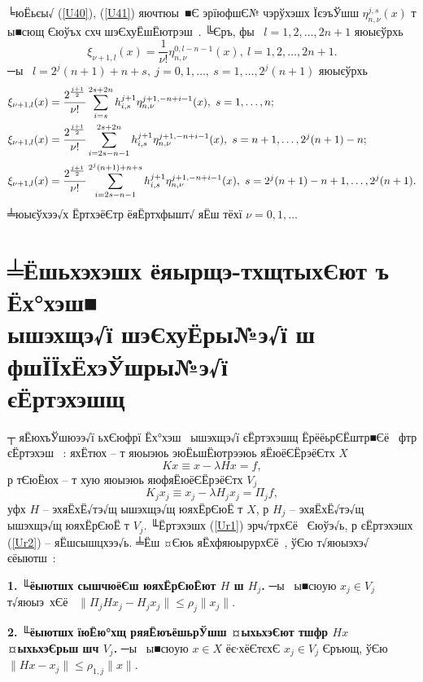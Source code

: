 \documentclass[12pt, a4paper, oneside]{article}
\begin{document}
\par
╘юЁьєы√ (\ref{U40}), (\ref{U41}) яючтюы ■Є эрїюфшЄ№ чэрўхэшх ЇєэъЎшш $\eta_{n,\nu}^{j,s}(x)$ т ы■сющ Єюўъх схч шэЄхуЁшЁютрэш . ╚Єръ, фы  $l=1,2,\dots, 2n+1$ яюыєўрхь
\[
{\xi}_{\nu+1,l}(x)=\frac{1}{\nu !} \eta_{n,\nu}^{0,l-n-1}(x),~l=1,2,\dots, 2n+1.
\]
─ы  $l=2^j(n+1)+n+s,~j=0,1,\dots,~s=1,\dots,2^{j}(n+1)$ яюыєўрхь
\begin{align}
&{\xi}_{\nu+1,l}(x)=\frac{2^{\frac{j+1}{2}}}{\nu !}\sum\limits_{i=s}^{2s+2n}h_{i,s}^{j+1}\eta_{n,\nu}^{j+1,-n+i-1}(x),~s=1,\dots,n; \notag\\
&{\xi}_{\nu+1,l}(x)=\frac{2^{\frac{j+1}{2}}}{\nu !}\sum\limits_{i=2s-n-1}^{2s+2n}h_{i,s}^{j+1}\eta_{n,\nu}^{j+1,-n+i-1}(x),~s=n+1,\dots,2^{j}(n+1)-n;\notag\\
&{\xi}_{\nu+1,l}(x)=\frac{2^{\frac{j+1}{2}}}{\nu !}\sum\limits_{i=2s-n-1}^{2^{j}(n+1)+n+s}h_{i,s}^{j+1}\eta_{n,\nu}^{j+1,-n+i-1}(x),~s=2^{j}(n+1)-n+1,\dots,2^{j}(n+1).\notag
\end{align}
╧юыєўхээ√х ЁртхэёЄтр ёяЁртхфышт√ яЁш тёхї $\nu = 0,1,\dots$
\section{╧Ёшьхэхэшх ёяырщэ-тхщтыхЄют ъ Ёх°хэш■\\ ышэхщэ√ї шэЄхуЁры№э√ї ш фшЇЇхЁхэЎшры№э√ї\\ єЁртэхэшщ}
┬ яЁюхъЎшюээ√ї ьхЄюфрї Ёх°хэш  ышэхщэ√ї єЁртэхэшщ ЁрёёьрЄЁштр■Єё  фтр єЁртэхэш   \cite{Akilov}: яхЁтюх -- т яюыэюь эюЁьшЁютрээюь яЁюёЄЁрэёЄтх $X$
\begin{equation}\label{Ur1}
Kx\equiv x-\lambda Hx=f,
\end{equation}
р тЄюЁюх -- т хую яюыэюь яюфяЁюёЄЁрэёЄтх $V_j$
\begin{equation}\label{Ur2}
K_j x_j\equiv x_j-\lambda H_j x_j=\Pi_j f,
\end{equation}
уфх $H$ -- эхяЁхЁ√тэ√щ ышэхщэ√щ юяхЁрЄюЁ т $X$, р $H_j$  -- эхяЁхЁ√тэ√щ ышэхщэ√щ юяхЁрЄюЁ т $V_j$. ╙Ёртэхэшх (\ref{Ur1}) эрч√трхЄё  Єюўэ√ь, р єЁртэхэшх (\ref{Ur2}) -- яЁшсышцхээ√ь. ╧Ёш ¤Єюь яЁхфяюырурхЄё , ўЄю т√яюыэхэ√ єёыютш :

\noindent \textbf{1. ╙ёыютшх сышчюёЄш юяхЁрЄюЁют $H$ ш $H_j$.} ─ы  ы■сюую $x_j\in V_j$ т√яюыэ хЄё  $\|\Pi_j H x_j - H_j x_j\|\leqslant \rho_j \|x_j\|$.

\noindent \textbf{2. ╙ёыютшх їюЁю°хщ ряяЁюъёшьрЎшш ¤ыхьхэЄют тшфр $Hx$ ¤ыхьхэЄрьш шч $V_j$.} ─ы  ы■сюую $x\in X$ ёє∙хёЄтєхЄ $x_j\in V_j$ Єръющ, ўЄю $\|Hx-x_j\|\leqslant \rho_{1,j} \|x\|$.
\end{document}
